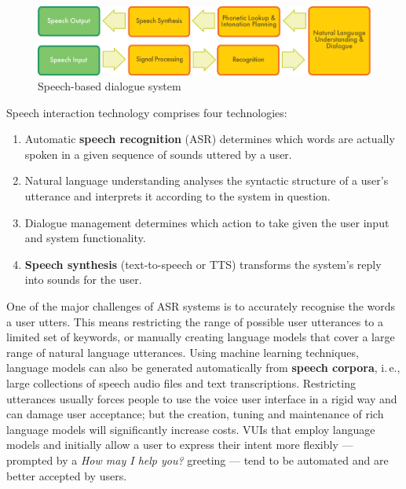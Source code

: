 \begin{multicols}{2}
\begin{figure}[htb]
  \center
  \includegraphics[width=\textwidth]{../_media/english/simple_speech-based_dialogue_architecture}
  \caption{Speech-based dialogue system}
  \label{fig:dialoguearch_en}
\end{figure}

Speech interaction technology comprises four technologies: 

\begin{enumerate}
\item Automatic \textbf{speech recognition} (ASR) determines which words are actually spoken in a given sequence of sounds uttered by a user.  
\item Natural language understanding analyses the syntactic structure of a user’s utterance and interprets it according to the system in question.
\item Dialogue management determines which action to take given the user input and system functionality.   
\item \textbf{Speech synthesis} (text-to-speech or TTS) transforms the system’s reply into sounds for the user.
\end{enumerate}

One of the major challenges of ASR systems is to accurately recognise the words a user utters. This means restricting the range of possible user utterances to a limited set of keywords, or manually creating language models that cover a large range of natural language utterances. Using machine learning techniques, language models can also be generated automatically from \textbf{speech corpora}, i.\,e., large collections of speech audio files and text transcriptions. Restricting utterances usually forces people to use the voice user interface in a rigid way and can damage user acceptance; but the creation, tuning and maintenance of rich language models will significantly increase costs. VUIs that employ language models and initially allow a user to express their intent more flexibly — prompted by a \textit{How may I help you?} greeting — tend to be automated and are better accepted by users.


\end{multicols}
